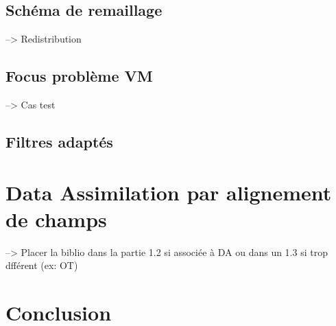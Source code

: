 \documentclass{article}
\begin{document}
\subsection{Schéma de remaillage}
--> Redistribution

\subsection{Focus problème VM}
--> Cas test

\subsection{Filtres adaptés}

\section{Data Assimilation par alignement de champs}
--> Placer la biblio dans la partie 1.2 si associée à DA ou dans un 1.3 si trop dfférent (ex: OT)

\section{Conclusion}
\end{document}
